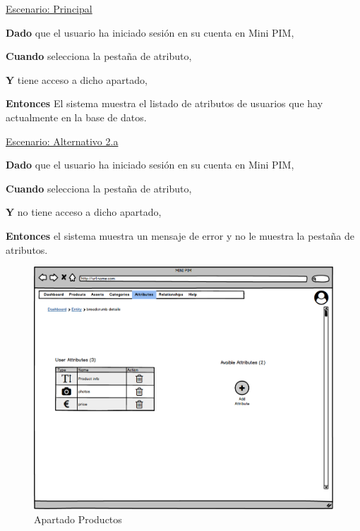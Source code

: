 \underline{Escenario: Principal}\par
\vspace{0.15cm}
\textbf{Dado} que el usuario ha iniciado sesión en su cuenta en Mini PIM,\par
\textbf{Cuando} selecciona la pestaña de atributo,\par
\textbf{Y} tiene acceso a dicho apartado,\par
\textbf{Entonces} El sistema muestra el listado de atributos de usuarios que hay actualmente en la base de datos.\par
\vspace{0.20cm}

\underline{Escenario: Alternativo 2.a}\par
\vspace{0.15cm}
\textbf{Dado} que el usuario ha iniciado sesión en su cuenta en Mini PIM,\par
\textbf{Cuando} selecciona la pestaña de atributo,\par
\textbf{Y} no tiene acceso a dicho apartado,\par
\textbf{Entonces} el sistema muestra un mensaje de error y no le muestra la pestaña de atributos.\par
\vspace{0.20cm}

\begin{figure}[H]
    \includegraphics[width=1\linewidth]{mockups/RF6.2Leer_Atributo.png}
    \caption{Apartado Productos}
   \end{figure}
\vspace{1.0cm}

